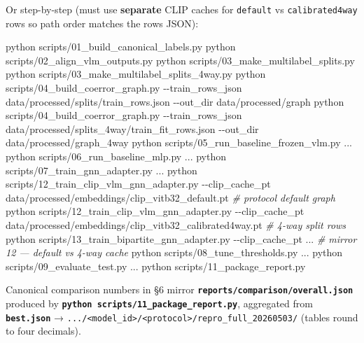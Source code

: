 \documentclass[
  11pt,
]{article}
\newenvironment{Shaded}{}{}
\newcommand{\AttributeTok}[1]{\textcolor[rgb]{0.49,0.56,0.16}{#1}}
\newcommand{\CommentTok}[1]{\textcolor[rgb]{0.38,0.63,0.69}{\textit{#1}}}
\newcommand{\ExtensionTok}[1]{#1}
\newcommand{\NormalTok}[1]{#1}
\begin{document}
Or step-by-step (must use \textbf{separate} CLIP caches for
\texttt{default} vs \texttt{calibrated4way} rows so path order matches
the rows JSON):

\begin{Shaded}
\begin{Highlighting}[]
\ExtensionTok{python}\NormalTok{ scripts/01\_build\_canonical\_labels.py}
\ExtensionTok{python}\NormalTok{ scripts/02\_align\_vlm\_outputs.py}
\ExtensionTok{python}\NormalTok{ scripts/03\_make\_multilabel\_splits.py}
\ExtensionTok{python}\NormalTok{ scripts/03\_make\_multilabel\_splits\_4way.py}
\ExtensionTok{python}\NormalTok{ scripts/04\_build\_coerror\_graph.py }\AttributeTok{{-}{-}train\_rows\_json}\NormalTok{ data/processed/splits/train\_rows.json }\AttributeTok{{-}{-}out\_dir}\NormalTok{ data/processed/graph}
\ExtensionTok{python}\NormalTok{ scripts/04\_build\_coerror\_graph.py }\AttributeTok{{-}{-}train\_rows\_json}\NormalTok{ data/processed/splits\_4way/train\_fit\_rows.json }\AttributeTok{{-}{-}out\_dir}\NormalTok{ data/processed/graph\_4way}
\ExtensionTok{python}\NormalTok{ scripts/05\_run\_baseline\_frozen\_vlm.py ...}
\ExtensionTok{python}\NormalTok{ scripts/06\_run\_baseline\_mlp.py ...}
\ExtensionTok{python}\NormalTok{ scripts/07\_train\_gnn\_adapter.py ...}
\ExtensionTok{python}\NormalTok{ scripts/12\_train\_clip\_vlm\_gnn\_adapter.py }\AttributeTok{{-}{-}clip\_cache\_pt}\NormalTok{ data/processed/embeddings/clip\_vitb32\_default.pt    }\CommentTok{\# protocol default graph}
\ExtensionTok{python}\NormalTok{ scripts/12\_train\_clip\_vlm\_gnn\_adapter.py }\AttributeTok{{-}{-}clip\_cache\_pt}\NormalTok{ data/processed/embeddings/clip\_vitb32\_calibrated4way.pt  }\CommentTok{\# 4{-}way split rows}
\ExtensionTok{python}\NormalTok{ scripts/13\_train\_bipartite\_gnn\_adapter.py }\AttributeTok{{-}{-}clip\_cache\_pt}\NormalTok{ ...  }\CommentTok{\# mirror 12 — default vs 4{-}way cache}
\ExtensionTok{python}\NormalTok{ scripts/08\_tune\_thresholds.py ...}
\ExtensionTok{python}\NormalTok{ scripts/09\_evaluate\_test.py ...}
\ExtensionTok{python}\NormalTok{ scripts/11\_package\_report.py}
\end{Highlighting}
\end{Shaded}

Canonical comparison numbers in §6 mirror
\textbf{\texttt{reports/comparison/overall.json}} produced by
\textbf{\texttt{python\ scripts/11\_package\_report.py}}, aggregated
from \textbf{\texttt{best.json}} →
\texttt{.../\textless{}model\_id\textgreater{}/\textless{}protocol\textgreater{}/repro\_full\_20260503/}
(tables round to four decimals).
\end{document}

